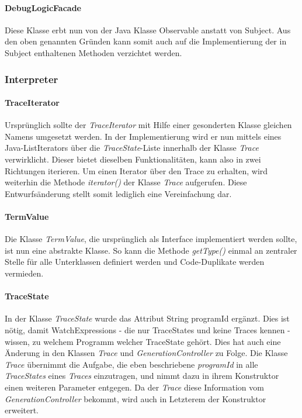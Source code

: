 \documentclass[parskip=full]{scrartcl}
\begin{document}
\paragraph{DebugLogicFacade}
Diese Klasse erbt nun von der Java Klasse Observable anstatt von Subject.
Aus den oben genannten Gründen kann somit auch auf die Implementierung der in Subject enthaltenen Methoden verzichtet werden.

\subsubsection{Interpreter}
\paragraph{TraceIterator}
Ursprünglich sollte der \textit{TraceIterator} mit Hilfe einer gesonderten Klasse gleichen Namens umgesetzt werden. In der Implementierung wird er nun mittels eines Java-ListIterators über die \textit{TraceState}-Liste innerhalb der Klasse \textit{Trace} verwirklicht. Dieser bietet dieselben Funktionalitäten, kann also in zwei Richtungen iterieren. Um einen Iterator über den Trace zu erhalten, wird weiterhin die Methode \textit{iterator()} der Klasse \textit{Trace} aufgerufen. Diese Entwurfsänderung stellt somit lediglich eine Vereinfachung dar.
\paragraph{TermValue}
Die Klasse \textit{TermValue}, die ursprünglich als Interface implementiert werden sollte, ist nun eine abstrakte Klasse. So kann die Methode \textit{getType()} einmal an zentraler Stelle für alle Unterklassen definiert werden und Code-Duplikate werden vermieden.
\paragraph{TraceState}
In der Klasse \textit{TraceState} wurde das Attribut String programId ergänzt. Dies ist nötig, damit WatchExpressions - die nur TraceStates und keine Traces kennen - wissen, zu welchem Programm welcher TraceState gehört. Dies hat auch eine Änderung in den Klassen \textit{Trace} und \textit{GenerationController} zu Folge. Die Klasse \textit{Trace} übernimmt die Aufgabe, die eben beschriebene \textit{programId} in alle \textit{TraceStates} eines \textit{Traces} einzutragen, und nimmt dazu in ihrem Konstruktor einen weiteren Parameter entgegen. Da der \textit{Trace} diese Information vom  \textit{GenerationController} bekommt, wird auch in Letzterem der Konstruktor erweitert.
 
\end{document}
